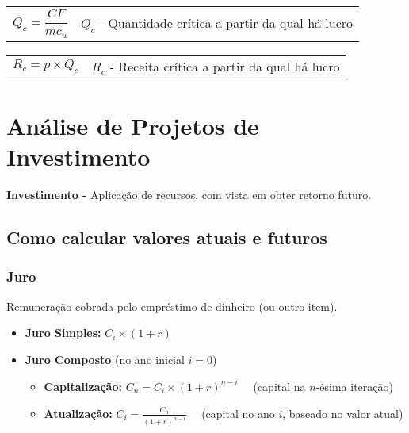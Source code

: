 \documentclass[11pt]{article}
\begin{document}
\begin{tabular}{ c c }
    \begin{minipage}{0.45\textwidth}
        \begin{equation*}
            Q_c = \frac{CF}{mc_u}
        \end{equation*}
    \end{minipage} &
    \begin{minipage}{0.45\textwidth}
        $Q_c$ - Quantidade crítica a partir da qual há lucro
    \end{minipage}
\end{tabular}

\begin{tabular}{ c c }
    \begin{minipage}{0.45\textwidth}
        \begin{equation*}
            R_c = p \times Q_c
        \end{equation*}
    \end{minipage} &
    \begin{minipage}{0.45\textwidth}
        $R_c$ - Receita crítica a partir da qual há lucro
    \end{minipage}
\end{tabular}

\newpage

\section{Análise de Projetos de Investimento}

\textbf{Investimento -} Aplicação de recursos, com vista em obter retorno futuro.

\subsection{Como calcular valores atuais e futuros}

\subsubsection{Juro}

Remuneração cobrada pelo empréstimo de dinheiro (ou outro item).
\begin{itemize}[topsep=0pt]
    \item \textbf{Juro Simples: }$C_i\times (1+r)$
    \item \textbf{Juro Composto} (no ano inicial $i=0$)
          \begin{itemize}
              \item \textbf{Capitalização: }$C_n=C_i\times(1+r)^{n-i}$
                    \ \ (capital na $n$-ésima iteração)
              \item \textbf{Atualização: }$\displaystyle C_i=\frac{C_n}{(1+r)^{n-i}}$
                    \ \ (capital no ano $i$, baseado no valor atual)
          \end{itemize}
\end{itemize}
\end{document}
